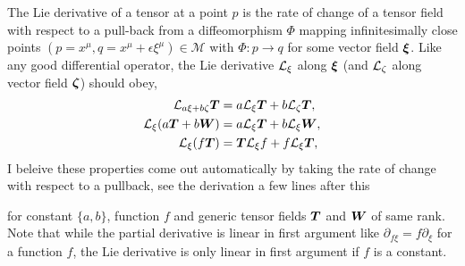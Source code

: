 The Lie derivative of a tensor at a point $p$ is the rate of change of a tensor field with respect to a pull-back from a diffeomorphism $\Phi$ mapping infinitesimally close points $(p=x^\mu,q= x^\mu+\epsilon \xi^\mu) \in \mathcal{M}$ with $\Phi:p \rightarrow q $ for some vector field $\boldsymbol{\xi}$. Like any good differential operator, the Lie derivative $\mathcal{L}_\xi$ along $\boldsymbol{\xi}$ (and $\mathcal{L}_\zeta$ along vector field $\boldsymbol{\zeta}$) should obey,
\begin{align}
\mathcal{L}_{a \xi + b \zeta}\boldsymbol{T}  &= a \mathcal{L}_\xi\boldsymbol{T}  + b \mathcal{L}_\zeta\boldsymbol{T} ,\\
\mathcal{L}_\xi (a \boldsymbol{T} + b \boldsymbol{W}) & = a \mathcal{L}_\xi \boldsymbol{T} + b \mathcal{L}_\xi \boldsymbol{W} , \\
\mathcal{L}_\xi (f \boldsymbol{T} ) &= \boldsymbol{T} \mathcal{L}_\xi f + f \mathcal{L}_\xi \boldsymbol{T} \label{intro:eq:lie_liebnitz},
\end{align}
\color{choral} I beleive these properties come out automatically by taking the rate of change with respect to a pullback, see the derivation a few lines after this \color{black}

for constant $\{a,b\}$, function $f$ and generic tensor fields $\boldsymbol{T}$ and $\boldsymbol{W}$ of same rank. Note that while the partial derivative is linear in first argument like $\partial_{f \xi} = f \partial_\xi$ for a function $f$, the Lie derivative is only linear in first argument if $f$ is a constant.

